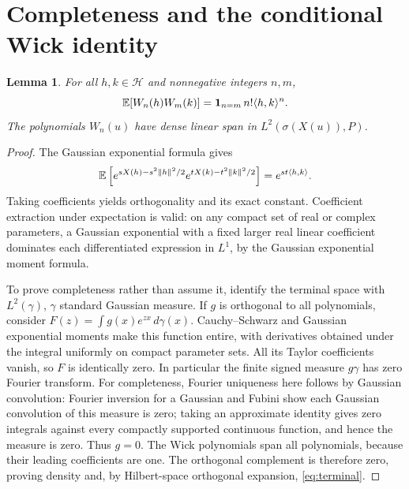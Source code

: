 \documentclass[11pt]{article}
\newtheorem{lemma}[theorem]{Lemma}
\newcommand{\Hh}{\mathcal H}\newcommand{\U}{\mathcal U}
\begin{document}
\section{Completeness and the conditional Wick identity}
\begin{lemma}\label{lem:hermite}
For all $h,k\in\Hh$ and nonnegative integers $n,m$,
\[
 \mathbb E[W_n(h)W_m(k)]=\mathbf1_{n=m}\,n!\langle h,k\rangle^n.
\]
The polynomials $W_n(u)$ have dense linear span in
$L^2(\sigma(X(u)),P)$.
\end{lemma}
\begin{proof}
The Gaussian exponential formula gives
\[
 \mathbb E\left[e^{sX(h)-s^2\|h\|^2/2}
         e^{tX(k)-t^2\|k\|^2/2}\right]=e^{st\langle h,k\rangle}.
\]
Taking coefficients yields orthogonality and its exact constant.
Coefficient extraction under expectation is valid: on any compact set
of real or complex parameters, a Gaussian exponential with a fixed
larger real linear coefficient dominates each differentiated expression
in $L^1$, by the Gaussian exponential moment formula.

To prove completeness rather than assume it, identify the terminal
space with $L^2(\gamma)$, $\gamma$ standard Gaussian measure. If $g$ is
orthogonal to all polynomials, consider
$F(z)=\int g(x)e^{zx}\,d\gamma(x)$. Cauchy--Schwarz and Gaussian
exponential moments make this function entire, with derivatives obtained
under the integral uniformly on compact parameter sets. All its Taylor
coefficients vanish, so $F$ is identically zero. In particular the finite
signed measure $g\gamma$ has zero Fourier transform.
For completeness, Fourier uniqueness here follows by Gaussian
convolution: Fourier inversion for a Gaussian and Fubini show each
Gaussian convolution of this measure is zero; taking an approximate
identity gives zero integrals against every compactly supported
continuous function, and hence the measure is zero. Thus $g=0$.
The Wick polynomials span all polynomials, because their leading
coefficients are one. The orthogonal complement is therefore zero,
proving density and, by Hilbert-space orthogonal expansion,
\eqref{eq:terminal}.
\end{proof}
\end{document}
